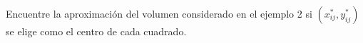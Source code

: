 \item Encuentre la aproximación del volumen considerado en el ejemplo 2 si $(x_{ij}^*, y_{ij}^*)$ se elige como el centro de cada cuadrado.
